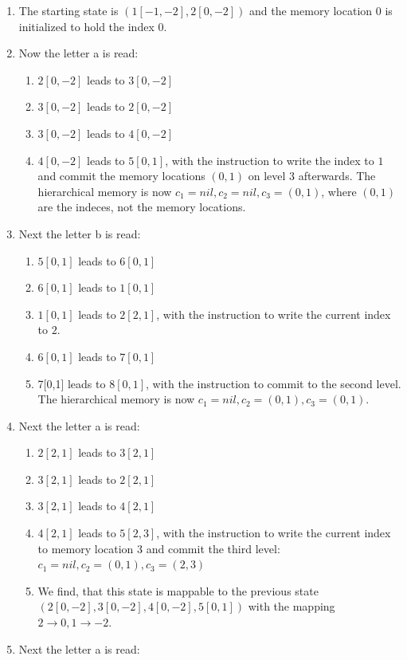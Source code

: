 \documentclass[english]{sigplanconf}
\begin{document}
\begin{enumerate}
\item The starting state is $(1[-1,-2],2[0,-2])$ and the memory location
$0$ is initialized to hold the index $0$.
\item Now the letter a is read:

\begin{enumerate}
\item $2[0,-2]$ leads to $3[0,-2]$
\item $3[0,-2]$ leads to $2[0,-2]$
\item $3[0,-2]$ leads to $4[0,-2]$
\item $4[0,-2]$ leads to $5[0,1]$, with the instruction to write the index
to $1$ and commit the memory locations $(0,1)$ on level $3$ afterwards.
The hierarchical memory is now $c_{1}=nil,c_{2}=nil,c_{3}=(0,1)$,
where $(0,1)$ are the indeces, not the memory locations.
\end{enumerate}
\item Next the letter b is read:

\begin{enumerate}
\item $5[0,1]$ leads to $6[0,1]$
\item $6[0,1]$ leads to $1[0,1]$
\item $1[0,1]$ leads to $2[2,1]$, with the instruction to write the current
index to $2$.
\item $6[0,1]$ leads to $7[0,1]$
\item 7{[}0,1{]} leads to $8[0,1]$, with the instruction to commit to the
second level. The hierarchical memory is now $c_{1}=nil,c_{2}=(0,1),c_{3}=(0,1)$.
\end{enumerate}
\item Next the letter a is read:

\begin{enumerate}
\item $2[2,1]$ leads to $3[2,1]$
\item $3[2,1]$ leads to $2[2,1]$
\item $3[2,1]$ leads to $4[2,1]$
\item $4[2,1]$ leads to $5[2,3]$, with the instruction to write the current
index to memory location $3$ and commit the third level: $c_{1}=nil,c_{2}=(0,1),c_{3}=(2,3)$
\item We find, that this state is mappable to the previous state $(2[0,-2],3[0,-2],4[0,-2],5[0,1])$
with the mapping $2\rightarrow0,1\rightarrow-2$.
\end{enumerate}
\item Next the letter a is read:


\end{enumerate}
\end{document}
